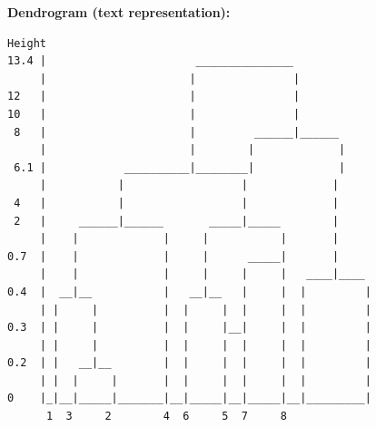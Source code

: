 \documentclass[12pt]{article}
\begin{document}
\begin{solution}
\textbf{Dendrogram (text representation):}

\begin{verbatim}
Height
13.4 |                       _______________
     |                      |               |
12   |                      |               |
10   |                      |               |
 8   |                      |         ______|______
     |                      |        |             |
 6.1 |            __________|________|             |
     |           |                  |             |
 4   |           |                  |             |
 2   |     ______|______       _____|_____        |
     |    |             |     |           |       |
0.7  |    |             |     |      _____|       |
     |    |             |     |     |     |   ____|____
0.4  |  __|__           |   __|__   |     |  |         |
     | |     |          |  |     |  |     |  |         |
0.3  | |     |          |  |     |__|     |  |         |
     | |     |          |  |     |  |     |  |         |
0.2  | |   __|__        |  |     |  |     |  |         |
     | |  |     |       |  |     |  |     |  |         |
0    |_|__|_____|_______|__|_____|__|_____|__|_________|
      1  3     2        4  6     5  7     8
\end{verbatim}

\end{solution}
\end{document}
